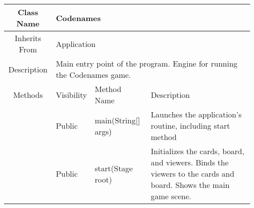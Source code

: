 \begin{tabularx}{\textwidth}{|c||l|l|l|X|}
    \hline
    \cellcolor{lightgray}Class Name & \multicolumn{4}{X|}{Codenames}\\
    \hline
    \cellcolor{lightgray}Inherits From & \multicolumn{4}{X|}{Application}\\
    \hline
    \cellcolor{lightgray}Description & \multicolumn{4}{p{12cm}|}{Main entry point of the program. Engine for running the Codenames game.}\\
    \hline\hline
    
    \cellcolor{lightgray}Methods & \cellcolor{lightgray}Visibility & \multicolumn{2}{l|}{\cellcolor{lightgray}Method Name} & \cellcolor{lightgray}Description\\\cline{2-5}
    \cellcolor{lightgray} & Public & \multicolumn{2}{l|}{main(String[] args)} & Launches the application's routine, including start method\\\cline{2-5}
    \cellcolor{lightgray} & Public & \multicolumn{2}{l|}{start(Stage root)} & Initializes the cards, board, and viewers. Binds the viewers to the cards and board. Shows the main game scene.\\
    \hline
\end{tabularx}